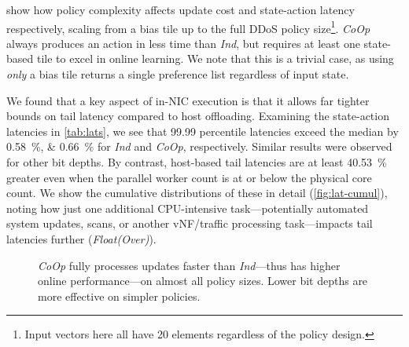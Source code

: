 \documentclass[
sigconf,natbib=false
]{acmart}
\newcommand{\Coopfw}{\emph{CoOp}}
\newcommand{\Indfw}{\emph{Ind}}
\begin{document}
 show how policy complexity affects update cost and state-action latency respectively, scaling from a bias tile up to the full DDoS policy size\footnote{Input vectors here all have 20 elements regardless of the policy design.}.
\Coopfw{} always produces an action in less time than \Indfw{}, but requires at least one state-based tile to excel in online learning.
We note that this is a trivial case, as using \emph{only} a bias tile returns a single preference list regardless of input state.

We found that a key aspect of in-NIC execution is that it allows far tighter bounds on tail latency compared to host offloading.
Examining the state-action latencies in \cref{tab:lats}, we see that \num{99.99} percentile latencies exceed the median by \SIlist{0.58;0.66}{\percent} for \Indfw{} and \Coopfw{}, respectively.
Similar results were observed for other bit depths.
By contrast, host-based tail latencies are at least \SI{40.53}{\percent} greater even when the parallel worker count is at or below the physical core count.
We show the cumulative distributions of these in detail (\cref{fig:lat-cumul}), noting how just one additional CPU-intensive task---potentially automated system updates, scans, or another vNF/traffic processing task---impacts tail latencies further (\emph{Float(Over)}).

\begin{figure}[t]
	\caption{\Coopfw{} fully processes updates faster than \Indfw{}---thus has higher online performance---on almost all policy sizes. Lower bit depths are more effective on simpler policies.\label{fig:vary-work}}
\end{figure}
\end{document}
